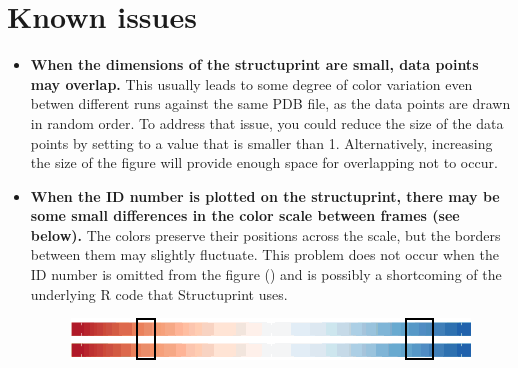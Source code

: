 \documentclass[12pt,a4paper]{article}
\begin{document}
\newpage
\section{Known issues}
\begin{itemize}
\item \textbf{When the dimensions of the structuprint are small, data points may overlap.} 
This usually leads to some degree of color variation even betwen different runs against the 
same PDB file, as the data points are drawn in random order. To address that issue, 
you could reduce the size of the data points by setting  to 
a value that is smaller than 1. Alternatively, increasing the size of the figure 
will provide enough space for overlapping not to occur.\\

\item \textbf{When the ID number is plotted on the structuprint, there may be 
some small differences in the color scale between frames (see below).} The colors 
preserve their positions across the scale, but the borders between them may 
slightly fluctuate. This problem does not occur when the ID number is omitted 
from the figure () and is possibly a shortcoming of the 
underlying  R code that Structuprint uses.
\vspace{-0.25cm}
\begin{figure}[!htbp]
    \centering
	\includegraphics[width=\textwidth]{figures/legend_diffs.png}
\end{figure}

\end{itemize}
\end{document}
